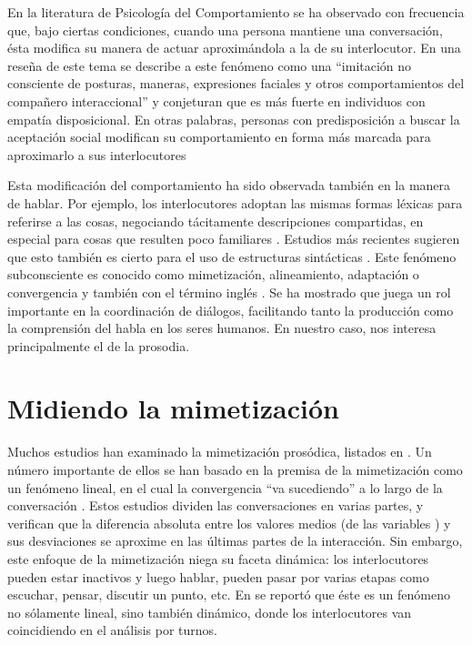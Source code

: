 En la literatura de Psicología del Comportamiento se ha observado con frecuencia que, bajo ciertas condiciones, cuando una persona mantiene una conversación, ésta modifica su manera de actuar aproximándola a la de su interlocutor. En una reseña de este tema se describe a este fenómeno como una ``imitación no consciente de posturas, maneras, expresiones faciales y otros comportamientos del compañero interaccional'' \cite[p. 893]{CHAR1999}  y conjeturan que es más fuerte en individuos con empatía disposicional. En otras palabras, personas con predisposición a buscar la aceptación social modifican su comportamiento en forma más marcada para aproximarlo a sus interlocutores

Esta modificación del comportamiento ha sido observada también en la manera de hablar. Por ejemplo, los interlocutores adoptan las mismas formas léxicas para referirse a las cosas, negociando tácitamente descripciones compartidas, en especial para cosas que resulten poco familiares \cite{BRE1996}. Estudios más recientes sugieren que esto también es cierto para el uso de estructuras sintácticas \cite{REI2006}. Este fenómeno subconsciente es conocido como mimetización, alineamiento, adaptación o convergencia y también con el término inglés \entrainment. Se ha mostrado que juega un rol importante en la coordinación de diálogos, facilitando tanto la producción como la comprensión del habla en los seres humanos\cite{nenkova2008, gravano2015backward}. En nuestro caso, nos interesa principalmente el \entrainment de la prosodia.

\section{Midiendo la mimetización}

Muchos estudios han examinado la mimetización prosódica, listados en \cite{DEL2013}. Un número importante de ellos se han basado en la premisa de la mimetización como un fenómeno lineal, en el cual la convergencia ``va sucediendo'' a lo largo de la conversación \cite{burgoon1995interpersonal}. Estos estudios dividen las conversaciones en varias partes, y verifican que la diferencia absoluta entre los valores medios (de las variables \ap) y sus desviaciones se aproxime en las últimas partes de la interacción. Sin embargo, este enfoque de la mimetización niega su faceta dinámica: los interlocutores pueden estar inactivos y luego hablar, pueden pasar por varias etapas como escuchar, pensar, discutir un punto, etc. En \cite{levitan2011measuring} se reportó que éste es un fenómeno no sólamente lineal, sino también dinámico, donde los interlocutores van coincidiendo en el análisis por turnos.

